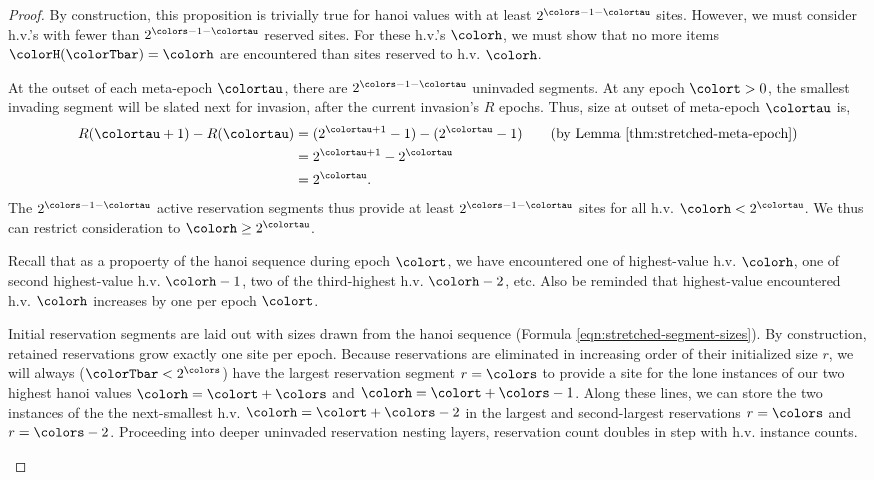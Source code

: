 \begin{proof}
By construction, this proposition is trivially true for hanoi values with at least $2^{\colors-1-\colortau}$ sites.
However, we must consider h.v.'s with fewer than $2^{\colors-1-\colortau}$ reserved sites.
For these h.v.'s $\colorh$, we must show that no more items $\colorH(\colorTbar) = \colorh$ are encountered than sites reserved to h.v. $\colorh$.

\begin{proofpart}

At the outset of each meta-epoch $\colortau$, there are $2^{\colors - 1 - \colortau}$ uninvaded segments.
At any epoch $\colort>0$, the smallest invading segment will be slated next for invasion, after the current invasion's $R$ epochs.
Thus, size at outset of meta-epoch $\colortau$ is,
\begin{align*}
R(\colortau + 1) - R(\colortau)
&= (2^{\colortau + 1} - 1) - (2^{\colortau} - 1) \tag{by Lemma \ref{thm:stretched-meta-epoch}}\\
&= 2^{\colortau + 1} - 2^{\colortau}\\
&= 2^{\colortau}.
\end{align*}
The $2^{\colors - 1 - \colortau}$ active reservation segments thus provide at least $2^{\colors - 1 - \colortau}$ sites for all h.v. $\colorh < 2^{\colortau}$.
We thus can restrict consideration to $\colorh \geq 2^{\colortau}$.
\end{proofpart}

\begin{proofpart}
Recall that as a propoerty of the hanoi sequence during epoch $\colort$, we have encountered one of highest-value h.v. $\colorh$, one of second highest-value h.v. $\colorh-1$, two of the third-highest h.v. $\colorh-2$, etc.
Also be reminded that highest-value encountered h.v. $\colorh$ increases by one per epoch $\colort$.

Initial reservation segments are laid out with sizes drawn from the hanoi sequence (Formula \ref{eqn:stretched-segment-sizes}).
By construction, retained reservations grow exactly one site per epoch.
Because reservations are eliminated in increasing order of their initialized size $r$, we will always ($\colorTbar < 2^{\colors}$) have the largest reservation segment $r=\colors$ to provide a site for the lone instances of our two highest hanoi values $\colorh=\colort+\colors$ and $\colorh=\colort+\colors-1$.
Along these lines, we can store the two instances of the the next-smallest h.v. $\colorh=\colort+\colors-2$ in the largest and second-largest reservations $r=\colors$ and $r=\colors-2$.
Proceeding into deeper uninvaded reservation nesting layers, reservation count doubles in step with h.v. instance counts.


\end{proofpart}
\end{proof}

